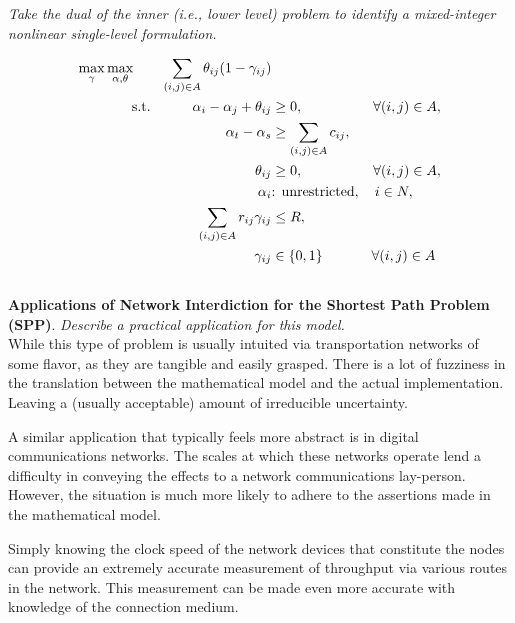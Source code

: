 \documentclass[12pt]{amsart}
\begin{document}
\subsubsection{}
\textit{Take the dual of the inner (i.e., lower level) problem to identify a mixed-integer
	nonlinear single-level formulation.}

	\begin{align*}
		\max_\gamma\max_{\alpha,\theta} \qquad \sum_{(i,j)\in A} \theta_{ij}(1-\gamma_{ij})& \\
		\text{s.t.}\qquad\quad
		\alpha_i - \alpha_j + \theta_{ij} &\geq 0,\hspace{5em} \forall(i,j) \in A, \\
		\alpha_t - \alpha_s &\geq \sum_{(i,j)\in A} c_{ij}, \\
		\theta_{ij} &\geq 0, \hspace{5em} \forall(i,j) \in A,  \\
		\alpha_i &\text{: unrestricted}, \quad i\in N, \\
		\sum_{(i,j)\in A} r_{ij}\gamma_{ij} &\leq R, \\
		\gamma_{ij} &\in \{0,1\}\hspace{3.5em} \forall(i,j) \in A
	\end{align*}

\subsection{}
\textbf{Applications of Network Interdiction for the Shortest Path Problem (SPP)}.
\textit{Describe a practical application for this model.} \\

	While this type of problem is usually intuited via transportation networks of some flavor, 
	as they are tangible and easily grasped. There is a lot of fuzziness in the translation between
	the mathematical model and the actual implementation. Leaving a (usually acceptable) amount of 
	irreducible uncertainty.
	
	A similar application that typically feels more abstract is in digital communications networks.
	The scales at which these networks operate lend a difficulty in conveying the effects to a network
	communications lay-person. However, the situation is much more likely to adhere to the assertions made
	in the mathematical model.
	
	Simply knowing the clock speed of the network devices that constitute the nodes can provide an extremely
	accurate measurement of throughput via various routes in the network.
	This measurement can be made even more accurate with knowledge of the connection medium.
	
\end{document}
